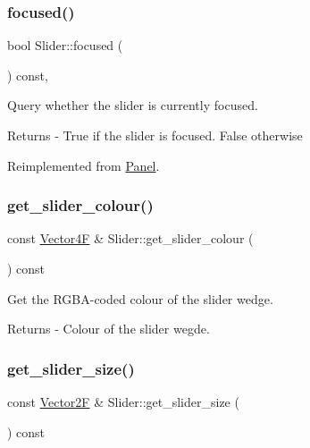 \subsubsection{\texorpdfstring{focused()}{focused()}}
{\footnotesize\ttfamily bool Slider\+::focused (\begin{DoxyParamCaption}{ }\end{DoxyParamCaption}) const\hspace{0.3cm}{\ttfamily [override]}, {\ttfamily [virtual]}}

Query whether the slider is currently focused. \begin{DoxyReturn}{Returns}
-\/ True if the slider is focused. False otherwise 
\end{DoxyReturn}


Reimplemented from \mbox{\hyperlink{class_panel_ace2217419ea5c2e98a38678c6e2012e1}{Panel}}.

\mbox{\label{class_slider_a660889686a2d0b9d73fb25cfb9eaff9a}} 
\subsubsection{\texorpdfstring{get\+\_\+slider\+\_\+colour()}{get\_slider\_colour()}}
{\footnotesize\ttfamily const \mbox{\hyperlink{class_vector4}{Vector4F}} \& Slider\+::get\+\_\+slider\+\_\+colour (\begin{DoxyParamCaption}{ }\end{DoxyParamCaption}) const}

Get the R\+G\+B\+A-\/coded colour of the slider wedge. \begin{DoxyReturn}{Returns}
-\/ Colour of the slider wegde. 
\end{DoxyReturn}
\mbox{\label{class_slider_a235e764dfafeacc678b77f5300f44dba}} 
\subsubsection{\texorpdfstring{get\+\_\+slider\+\_\+size()}{get\_slider\_size()}}
{\footnotesize\ttfamily const \mbox{\hyperlink{class_vector2}{Vector2F}} \& Slider\+::get\+\_\+slider\+\_\+size (\begin{DoxyParamCaption}{ }\end{DoxyParamCaption}) const}

